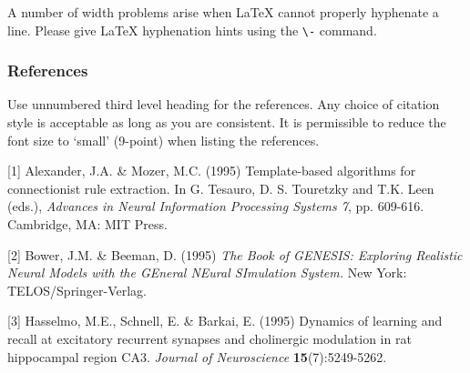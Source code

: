 \documentclass{article} %
\begin{document}
A number of width problems arise when LaTeX cannot properly hyphenate a
line. Please give LaTeX hyphenation hints using the \verb+\-+ command.



\subsubsection*{References}
Use unnumbered third level heading for
the references. Any choice of citation style is acceptable as long as you are
consistent. It is permissible to reduce the font size to `small' (9-point)
when listing the references.

\small{
[1] Alexander, J.A. \& Mozer, M.C. (1995) Template-based algorithms
for connectionist rule extraction. In G. Tesauro, D. S. Touretzky
and T.K. Leen (eds.), {\it Advances in Neural Information Processing
Systems 7}, pp. 609-616. Cambridge, MA: MIT Press.

[2] Bower, J.M. \& Beeman, D. (1995) {\it The Book of GENESIS: Exploring
Realistic Neural Models with the GEneral NEural SImulation System.}
New York: TELOS/Springer-Verlag.

[3] Hasselmo, M.E., Schnell, E. \& Barkai, E. (1995) Dynamics of learning
and recall at excitatory recurrent synapses and cholinergic modulation
in rat hippocampal region CA3. {\it Journal of Neuroscience}
{\bf 15}(7):5249-5262.
}
\end{document}
